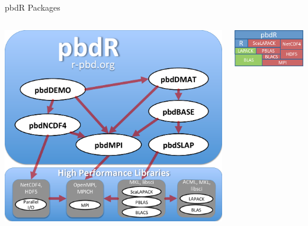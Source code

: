 \begin{frame}
  \begin{block}{pbdR Packages}
    \begin{center}
      \begin{columns}
        \begin{column}{.52\textwidth}
      \includegraphics[scale=.3]{../common/pics/pbdR-graph}
        \end{column}
        \hfill
        \begin{column}{.4\textwidth}
      \includegraphics[scale=.45]{../common/pics/libs}
        \end{column}
      \end{columns}
    \end{center}
  \end{block}
\end{frame}


